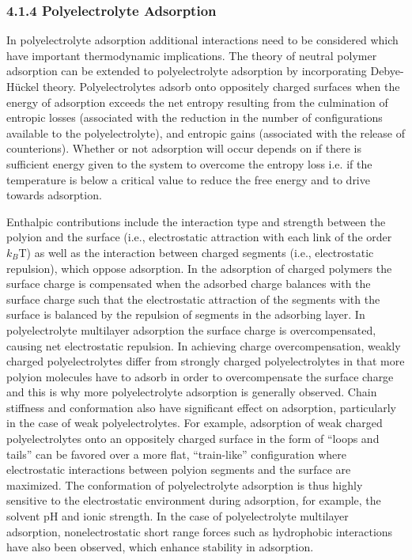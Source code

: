 \documentclass[journal=mamobx,manuscript=article]{achemso}
\begin{document}
\subsubsection{4.1.4 Polyelectrolyte Adsorption}


In polyelectrolyte adsorption additional interactions need to be considered which have important thermodynamic implications. The theory of neutral polymer adsorption can be extended to polyelectrolyte adsorption by incorporating Debye-H\"uckel theory.\cite{Chatellier1996}  Polyelectrolytes adsorb onto oppositely charged surfaces when the energy of adsorption exceeds the net entropy resulting from the culmination of entropic losses (associated with the reduction in the number of configurations available to the polyelectrolyte), and entropic gains (associated with the release of counterions).  Whether or not adsorption will occur depends on if there is sufficient energy given to the system to overcome the entropy loss i.e. if the temperature is below a critical value to reduce the free energy and to drive towards adsorption.

Enthalpic contributions include the interaction type and strength between the polyion and the surface (i.e., electrostatic attraction with each link of the order $k_B$T) as well as the interaction between charged segments (i.e., electrostatic repulsion), which oppose adsorption.\cite{Hoogeveen1996,VonGoeler1994}  In the adsorption of charged polymers the surface charge is compensated when the adsorbed charge balances with the surface charge such that the electrostatic attraction of the segments with the surface is balanced by the repulsion of segments in the adsorbing layer.  In polyelectrolyte multilayer adsorption the surface charge is overcompensated, causing net electrostatic repulsion.  In achieving charge overcompensation, weakly charged polyelectrolytes differ from strongly charged polyelectrolytes in that more polyion molecules have to adsorb in order to overcompensate the surface charge and this is why more polyelectrolyte adsorption is generally observed.  Chain stiffness and conformation also have significant effect on adsorption, particularly in the case of weak polyelectrolytes.\cite{Dzubiella2003}  For example, adsorption of weak charged polyelectrolytes onto an oppositely charged surface in the form of “loops and tails” can be favored over a more flat, “train-like” configuration where electrostatic interactions between polyion segments and the surface are maximized. \cite{Borisov1994}  The conformation of polyelectrolyte adsorption is thus highly sensitive to the electrostatic environment during adsorption, for example, the solvent pH and ionic strength.\cite{Notley2004}  In the case of polyelectrolyte multilayer adsorption, nonelectrostatic short range forces such as hydrophobic interactions have also been observed, which enhance stability in adsorption.\cite{Kotov1999}  
\end{document}
